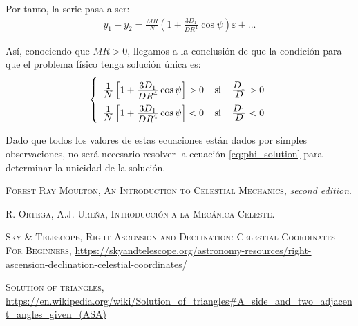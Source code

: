 \documentclass[11pt]{article}
\newcommand\ddfrac[2]{\frac{\displaystyle #1}{\displaystyle #2}}
\begin{document}
\vspace{0.4cm}

Por tanto, la serie pasa a ser:
\begin{align}
y_1-y_2=\ddfrac{MR}{N}\left(1+\ddfrac{3D_1}{DR^4}\cos{\psi}\right)\varepsilon+...
\label{eq:y1_y2_serie2}
\end{align}

Así, conociendo que $MR>0$, llegamos a la conclusión de que la condición para que el problema físico tenga solución única es:
\begin{align}
\left\{
\def\arraystretch{2}
\begin{array}{l}
	\ddfrac{1}{N}\left[1+\ddfrac{3D_1}{DR^4}\cos{\psi}\right]>0 \; \; \; \; \text{si} \; \; \; \; \ddfrac{D_1}{D}>0\\
	\ddfrac{1}{N}\left[1+\ddfrac{3D_1}{DR^4}\cos{\psi}\right]<0 \; \; \; \; \text{si} \; \; \; \; \ddfrac{D_1}{D}<0
\end{array}
\right.
\label{eq:condicion_unicidad}
\end{align}

Dado que todos los valores de estas ecuaciones están dados por simples observaciones, no será necesario resolver la ecuación \eqref{eq:phi_solution} para determinar la unicidad de la solución.












\newpage

\begin{thebibliography}{99}
 \textsc{Forest Ray Moulton}, \textsc{An Introduction to Celestial Mechanics}, \textit{second edition}.

 \textsc{R. Ortega, A.J. Ureña}, \textsc{Introducción a la Mecánica Celeste}.

 \textsc{Sky \& Telescope}, \textsc{Right Ascension and Declination: Celestial Coordinates For Beginners}, \url{https://skyandtelescope.org/astronomy-resources/right-ascension-declination-celestial-coordinates/}

 \textsc{Solution of triangles}, \url{https://en.wikipedia.org/wiki/Solution_of_triangles#A_side_and_two_adjacent_angles_given_(ASA)}

\end{thebibliography}
\end{document}
